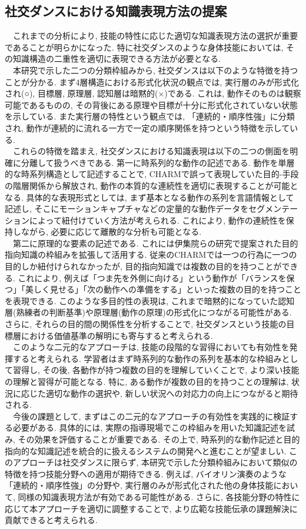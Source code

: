\subsection{社交ダンスにおける知識表現方法の提案}
　これまでの分析により, 技能の特性に応じた適切な知識表現方法の選択が重要であることが明らかになった. 特に社交ダンスのような身体技能においては, その知識構造の二重性を適切に表現できる方法が必要となる.\\
　本研究で示した二つの分類枠組みから, 社交ダンスは以下のような特徴を持つことが分かる. まず4層構造における形式化状況の観点では, 実行層のみが形式化され(○), 目標層, 原理層, 認知層は暗黙的(×)である. これは, 動作そのものは観察可能であるものの, その背後にある原理や目標が十分に形式化されていない状態を示している. また実行層の特性という観点では, 「連続的・順序性強」に分類され, 動作が連続的に流れる一方で一定の順序関係を持つという特徴を示している.\\
　これらの特徴を踏まえ, 社交ダンスにおける知識表現は以下の二つの側面を明確に分離して扱うべきである. 第一に時系列的な動作の記述である. 動作を単層的な時系列構造として記述することで, CHARMで誤って表現していた目的-手段の階層関係から解放され, 動作の本質的な連続性を適切に表現することが可能となる. 具体的な表現形式としては, まず基本となる動作の系列を言語情報として記述し, そこにモーションキャプチャなどの定量的な動作データをセグメンテーションによって紐付けていく方法が考えられる. これにより, 動作の連続性を保持しながら, 必要に応じて離散的な分析も可能となる.\\
　第二に原理的な要素の記述である. これには伊集院ら\cite{Ijuin2022}の研究で提案された目的指向知識の枠組みを拡張して活用する. 従来のCHARMでは一つの行為に一つの目的しか紐付けられなかったが, 目的指向知識では複数の目的を持つことができる. これにより, 例えば「つま先を外側に向ける」という動作が「バランスを保つ」「美しく見せる」「次の動作への準備をする」といった複数の目的を持つことを表現できる. このような多目的性の表現は, これまで暗黙的になっていた認知層(熟練者の判断基準)や原理層(動作の原理)の形式化につながる可能性がある. さらに, それらの目的間の関係性を分析することで, 社交ダンスという技能の目標層における価値基準の解明にも寄与すると考えられる.\\
　このような二元的なアプローチは, 技能の段階的な習得においても有効性を発揮すると考えられる. 学習者はまず時系列的な動作の系列を基本的な枠組みとして習得し, その後, 各動作が持つ複数の目的を理解していくことで, より深い技能の理解と習得が可能となる. 特に, ある動作が複数の目的を持つことの理解は, 状況に応じた適切な動作の選択や, 新しい状況への対応力の向上につながると期待される.\\
　今後の課題として, まずはこの二元的なアプローチの有効性を実践的に検証する必要がある. 具体的には, 実際の指導現場でこの枠組みを用いた知識記述を試み, その効果を評価することが重要である. その上で, 時系列的な動作記述と目的指向的な知識記述を統合的に扱えるシステムの開発へと進むことが望ましい. このアプローチは社交ダンスに限らず, 本研究で示した分類枠組みにおいて類似の特徴を持つ技能分野への適用が期待できる. 例えば, バイオリン演奏のような「連続的・順序性強」の分野や, 実行層のみが形式化された他の身体技能において, 同様の知識表現方法が有効である可能性がある. さらに, 各技能分野の特性に応じて本アプローチを適切に調整することで, より広範な技能伝承の課題解決に貢献できると考えられる.\\

